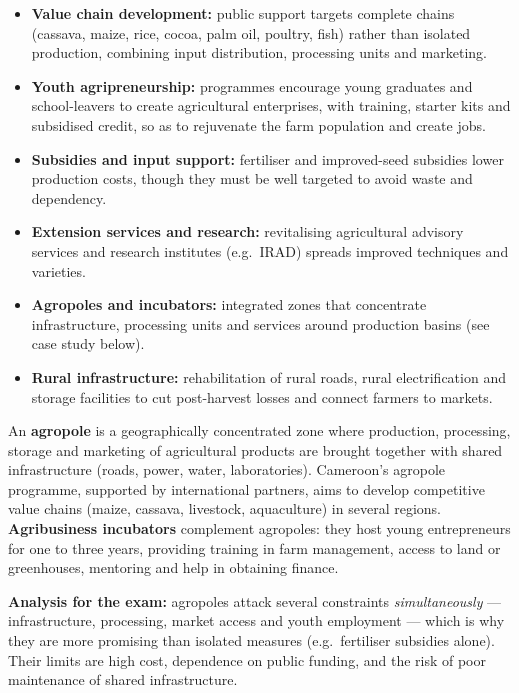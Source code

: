 \documentclass[11pt]{article}
\begin{document}
\begin{itemize}
\item \textbf{Value chain development:} public support targets complete chains (cassava, maize, rice, cocoa, palm oil, poultry, fish) rather than isolated production, combining input distribution, processing units and marketing.
\item \textbf{Youth agripreneurship:} programmes encourage young graduates and school-leavers to create agricultural enterprises, with training, starter kits and subsidised credit, so as to rejuvenate the farm population and create jobs.
\item \textbf{Subsidies and input support:} fertiliser and improved-seed subsidies lower production costs, though they must be well targeted to avoid waste and dependency.
\item \textbf{Extension services and research:} revitalising agricultural advisory services and research institutes (e.g.\ IRAD) spreads improved techniques and varieties.
\item \textbf{Agropoles and incubators:} integrated zones that concentrate infrastructure, processing units and services around production basins (see case study below).
\item \textbf{Rural infrastructure:} rehabilitation of rural roads, rural electrification and storage facilities to cut post-harvest losses and connect farmers to markets.
\end{itemize}

\begin{experience}
An \textbf{agropole} is a geographically concentrated zone where production, processing, storage and marketing of agricultural products are brought together with shared infrastructure (roads, power, water, laboratories). Cameroon's agropole programme, supported by international partners, aims to develop competitive value chains (maize, cassava, livestock, aquaculture) in several regions. \textbf{Agribusiness incubators} complement agropoles: they host young entrepreneurs for one to three years, providing training in farm management, access to land or greenhouses, mentoring and help in obtaining finance. \par
\textbf{Analysis for the exam:} agropoles attack several constraints \emph{simultaneously} — infrastructure, processing, market access and youth employment — which is why they are more promising than isolated measures (e.g.\ fertiliser subsidies alone). Their limits are high cost, dependence on public funding, and the risk of poor maintenance of shared infrastructure.
\end{experience}
\end{document}
